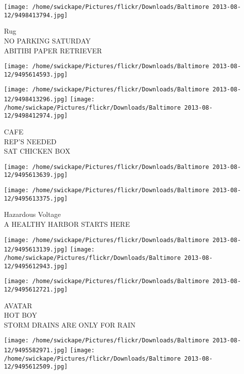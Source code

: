 \documentclass[10pt,letterpaper]{article}
\begin{document}
\vspace{0.25in}
\texttt{[image: /home/swickape/Pictures/flickr/Downloads/Baltimore 2013-08-12/9498413794.jpg]}

Rug\\
NO PARKING SATURDAY\\
ABITIBI PAPER RETRIEVER\\
\pagebreak

\texttt{[image: /home/swickape/Pictures/flickr/Downloads/Baltimore 2013-08-12/9495614593.jpg]}

\vspace{0.25in}
\texttt{[image: /home/swickape/Pictures/flickr/Downloads/Baltimore 2013-08-12/9498413296.jpg]}
\texttt{[image: /home/swickape/Pictures/flickr/Downloads/Baltimore 2013-08-12/9498412974.jpg]}

CAFE\\
REP'S NEEDED\\
SAT CHICKEN BOX\\
\pagebreak

\texttt{[image: /home/swickape/Pictures/flickr/Downloads/Baltimore 2013-08-12/9495613639.jpg]}

\vspace{0.25in}
\texttt{[image: /home/swickape/Pictures/flickr/Downloads/Baltimore 2013-08-12/9495613375.jpg]}

Hazardous Voltage\\
A HEALTHY HARBOR STARTS HERE\\
\pagebreak

\texttt{[image: /home/swickape/Pictures/flickr/Downloads/Baltimore 2013-08-12/9495613139.jpg]}
\texttt{[image: /home/swickape/Pictures/flickr/Downloads/Baltimore 2013-08-12/9495612943.jpg]}

\vspace{0.25in}
\texttt{[image: /home/swickape/Pictures/flickr/Downloads/Baltimore 2013-08-12/9495612721.jpg]}

AVATAR\\
HOT BOY\\
STORM DRAINS ARE ONLY FOR RAIN\\
\pagebreak

\texttt{[image: /home/swickape/Pictures/flickr/Downloads/Baltimore 2013-08-12/9495582971.jpg]}
\texttt{[image: /home/swickape/Pictures/flickr/Downloads/Baltimore 2013-08-12/9495612509.jpg]}
\end{document}

